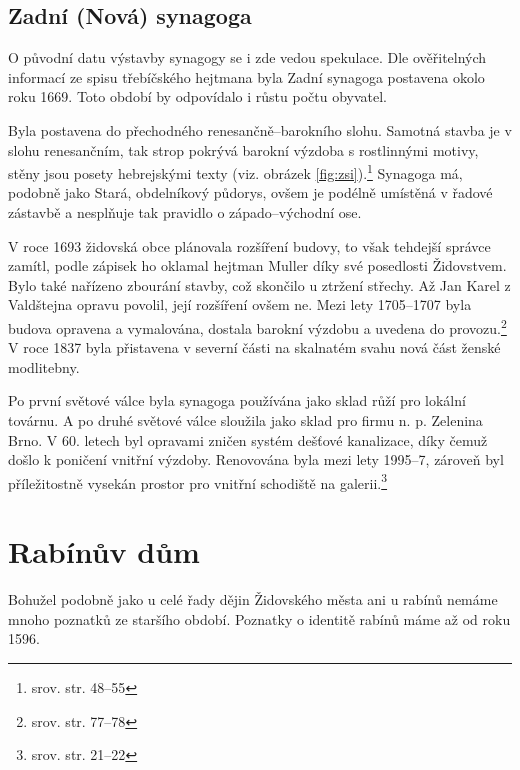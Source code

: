 \documentclass[a4paper,oneside,12pt]{report}
\begin{document}
\subsection{Zadní (Nová) synagoga}

O původní datu výstavby synagogy se i zde vedou spekulace.
Dle ověřitelných informací ze spisu třebíčského hejtmana byla Zadní synagoga postavena okolo roku 1669.
Toto období by odpovídalo i růstu počtu obyvatel.

Byla postavena do přechodného renesančně--barokního slohu.
Samotná stavba je v slohu renesančním, tak strop pokrývá barokní výzdoba s rostlinnými motivy, stěny jsou posety hebrejskými texty (viz. obrázek \ref{fig:zsi}).\footnote{srov. \cite{Klenovsky2003} str. 48--55}
Synagoga má, podobně jako Stará, obdelníkový půdorys, ovšem je podélně umístěná v řadové zástavbě a nesplňuje tak pravidlo o západo--východní ose.

V roce 1693 židovská obce plánovala rozšíření budovy, to však tehdejší správce zamítl, podle zápisek ho oklamal hejtman Muller díky své posedlosti Židovstvem.
Bylo také nařízeno zbourání stavby, což skončilo u ztržení střechy.
Až Jan Karel z Valdštejna opravu povolil, její rozšíření ovšem ne.
Mezi lety 1705--1707 byla budova opravena a vymalována, dostala barokní výzdobu a uvedena do provozu.\footnote{srov. \cite{Fiser2005} str. 77--78}
V roce 1837 byla přistavena v severní části na skalnatém svahu nová část ženské modlitebny.

Po první světové válce byla synagoga používána jako sklad růží pro lokální továrnu.
A po druhé světové válce sloužila jako sklad pro firmu n. p. Zelenina Brno.
V 60. letech byl opravami zničen systém dešťové kanalizace, díky čemuž došlo k poničení vnitřní výzdoby.
Renovována byla mezi lety 1995--7, zároveň byl příležitostně vysekán prostor pro vnitřní schodiště na galerii.\footnote{srov. \cite{Hanackova2008} str. 21--22}

\section{Rabínův dům}

Bohužel podobně jako u celé řady dějin Židovského města ani u rabínů nemáme mnoho poznatků ze staršího období.
Poznatky o identitě rabínů máme až od roku 1596.
\end{document}

